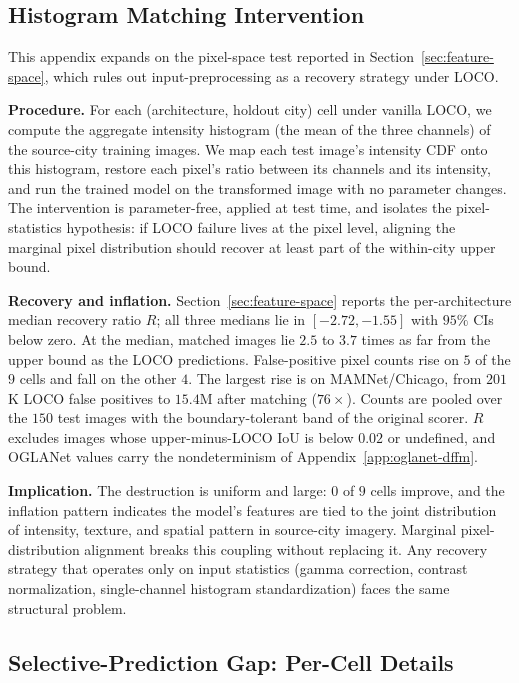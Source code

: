 
\subsection{Histogram Matching Intervention}
\label{app:pixel-intervention}

This appendix expands on the pixel-space test reported in Section~\ref{sec:feature-space}, which rules out input-preprocessing as a recovery strategy under LOCO.

\textbf{Procedure.} For each (architecture, holdout city) cell under vanilla LOCO, we compute the aggregate intensity histogram (the mean of the three channels) of the source-city training images. We map each test image's intensity CDF onto this histogram, restore each pixel's ratio between its channels and its intensity, and run the trained model on the transformed image with no parameter changes. The intervention is parameter-free, applied at test time, and isolates the pixel-statistics hypothesis: if LOCO failure lives at the pixel level, aligning the marginal pixel distribution should recover at least part of the within-city upper bound.

\textbf{Recovery and inflation.} Section~\ref{sec:feature-space} reports the per-architecture median recovery ratio $R$; all three medians lie in $[-2.72, -1.55]$ with $95\%$ CIs below zero. At the median, matched images lie $2.5$ to $3.7$ times as far from the upper bound as the LOCO predictions. False-positive pixel counts rise on $5$ of the $9$ cells and fall on the other $4$. The largest rise is on MAMNet/Chicago, from $201$K LOCO false positives to $15.4$M after matching ($76\times$). Counts are pooled over the $150$ test images with the boundary-tolerant band of the original scorer. $R$ excludes images whose upper-minus-LOCO IoU is below $0.02$ or undefined, and OGLANet values carry the nondeterminism of Appendix~\ref{app:oglanet-dffm}.

\textbf{Implication.} The destruction is uniform and large: $0$ of $9$ cells improve, and the inflation pattern indicates the model's features are tied to the joint distribution of intensity, texture, and spatial pattern in source-city imagery. Marginal pixel-distribution alignment breaks this coupling without replacing it. Any recovery strategy that operates only on input statistics (gamma correction, contrast normalization, single-channel histogram standardization) faces the same structural problem.

\subsection{Selective-Prediction Gap: Per-Cell Details}
\label{app:sp-details}

